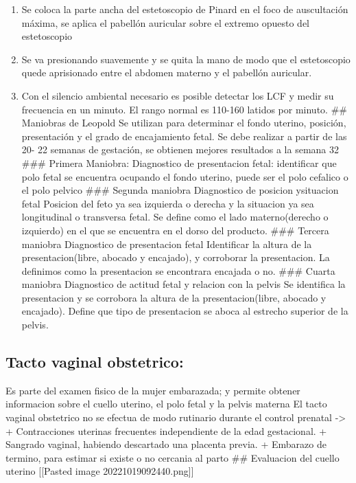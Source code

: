 \documentclass[
]{article}
\providecommand{\tightlist}{%
  \setlength{\itemsep}{0pt}\setlength{\parskip}{0pt}}
\begin{document}
\begin{enumerate}
\def\labelenumi{\arabic{enumi}.}
\tightlist
\item
  Se coloca la parte ancha del estetoscopio de Pinard en el foco de
  auscultación máxima, se aplica el pabellón auricular sobre el extremo
  opuesto del estetoscopio
\item
  Se va presionando suavemente y se quita la mano de modo que el
  estetoscopio quede aprisionado entre el abdomen materno y el pabellón
  auricular.
\item
  Con el silencio ambiental necesario es posible detectar los LCF y
  medir su frecuencia en un minuto. El rango normal es 110-160 latidos
  por minuto. \#\# Maniobras de Leopold Se utilizan para determinar el
  fondo uterino, posición, presentación y el grado de encajamiento
  fetal. Se debe realizar a partir de las 20- 22 semanas de gestación,
  se obtienen mejores resultados a la semana 32 \#\#\# Primera Maniobra:
  Diagnostico de presentacion fetal: identificar que polo fetal se
  encuentra ocupando el fondo uterino, puede ser el polo cefalico o el
  polo pelvico \#\#\# Segunda maniobra Diagnostico de posicion
  ysituacion fetal Posicion del feto ya sea izquierda o derecha y la
  situacion ya sea longitudinal o transversa fetal. Se define como el
  lado materno(derecho o izquierdo) en el que se encuentra en el dorso
  del producto. \#\#\# Tercera maniobra Diagnostico de presentacion
  fetal Identificar la altura de la presentacion(libre, abocado y
  encajado), y corroborar la presentacion. La definimos como la
  presentacion se encontrara encajada o no. \#\#\# Cuarta maniobra
  Diagnostico de actitud fetal y relacion con la pelvis Se identifica la
  presentacion y se corrobora la altura de la presentacion(libre,
  abocado y encajado). Define que tipo de presentacion se aboca al
  estrecho superior de la pelvis.
\end{enumerate}

\hypertarget{tacto-vaginal-obstetrico}{%
\subsection{Tacto vaginal obstetrico:}\label{tacto-vaginal-obstetrico}}

Es parte del examen fisico de la mujer embarazada; y permite obtener
informacion sobre el cuello uterino, el polo fetal y la pelvis materna
El tacto vaginal obstetrico no se efectua de modo rutinario durante el
control prenatal -\textgreater{} + Contracciones uterinas frecuentes
independiente de la edad gestacional. + Sangrado vaginal, habiendo
descartado una placenta previa. + Embarazo de termino, para estimar si
existe o no cercania al parto \#\# Evaluacion del cuello uterino
{[}{[}Pasted image 20221019092440.png{]}{]}
\end{document}
